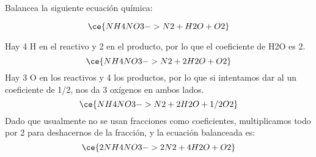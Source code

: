 Balancea la siguiente ecuación química:

\[
    \ce{NH4NO3 -> N2 + H2O + O2}
\]

\begin{solutionbox}{6cm}
    Hay 4 H en el reactivo y 2 en el producto, por lo que el coeficiente de H2O es 2.
    \[
        \ce{NH4NO3 -> N2 + 2H2O + O2}
    \]
    Hay 3 O en los reactivos y 4 los productos, por lo que si intentamos dar al  un coeficiente de 1/2, nos da 3 oxígenos en ambos lados.
    \[
        \ce{NH4NO3 -> N2 + 2H2O + 1/2O2}
    \]
    Dado que usualmente no se usan fracciones como coeficientes, multiplicamos todo por 2 para deshacernos de la fracción, y la ecuación balanceada es:
    \[
        \ce{2NH4NO3 -> 2N2 + 4H2O + O2}
    \]
\end{solutionbox}